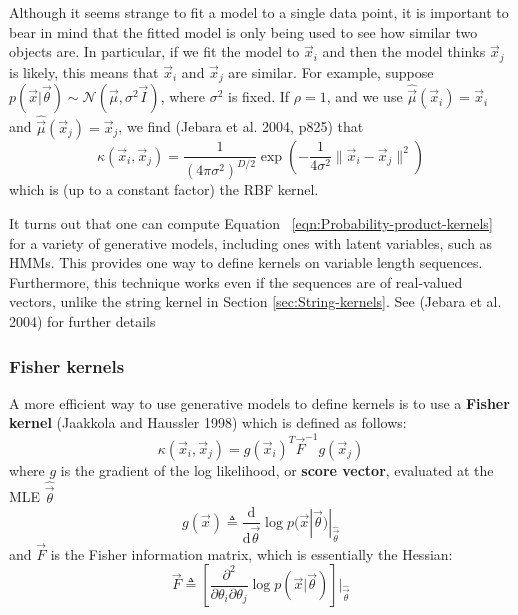 Although it seems strange to fit a model to a single data point, it is important to bear in mind that the fitted model is only being used to see how similar two objects are. In particular, if we fit the model to $\vec{x}_i$ and then the model thinks $\vec{x}_j$ is likely, this means that $\vec{x}_i$ and $\vec{x}_j$ are similar. For example, suppose $p(\vec{x}|\vec{\theta}) \sim \mathcal{N}(\vec{\mu},\sigma^2\vec{I})$, where $\sigma^2$ is fixed. If $\rho=1$, and we use $\hat{\vec{\mu}}(\vec{x}_i)=\vec{x}_i$ and $\hat{\vec{\mu}}(\vec{x}_j)=\vec{x}_j$, we find (Jebara et al. 2004, p825) that
\begin{equation}
\kappa(\vec{x}_i,\vec{x}_j)=\frac{1}{(4\pi\sigma^2)^{D/2}}\exp\left(-\frac{1}{4\sigma^2}\lVert\vec{x}_i-\vec{x}_j\rVert^2\right)
\end{equation}
which is (up to a constant factor) the RBF kernel.

It turns out that one can compute Equation ~\eqref{eqn:Probability-product-kernels} for a variety of generative models, including ones with latent variables, such as HMMs. This provides one way to define kernels on variable length sequences. Furthermore, this technique works even if the sequences are of real-valued vectors, unlike the string kernel in Section \ref{sec:String-kernels}. See (Jebara et al. 2004) for further details


\subsubsection{Fisher kernels}
A more efficient way to use generative models to define kernels is to use a \textbf{Fisher kernel} (Jaakkola and Haussler 1998) which is defined as follows:
\begin{equation}
\kappa(\vec{x}_i,\vec{x}_j)=g(\vec{x}_i)^T\vec{F}^{-1}g(\vec{x}_j)
\end{equation}
where $g$ is the gradient of the log likelihood, or \textbf{score vector}, evaluated at the MLE $\hat{\vec{\theta}}$
\begin{equation}
g(\vec{x}) \triangleq \frac{\mathrm{d}}{\mathrm{d}\vec{\theta}}\log p(\vec{x}|\vec{\theta})|_{\hat{\vec{\theta}}}
\end{equation}
and $\vec{F}$ is the Fisher information matrix, which is essentially the Hessian:
\begin{equation}
\vec{F} \triangleq \left[\frac{\partial^2}{\partial \theta_i \partial \theta_j}\log p(\vec{x}|\vec{\theta})\right]|_{\hat{\vec{\theta}}}
\end{equation}

